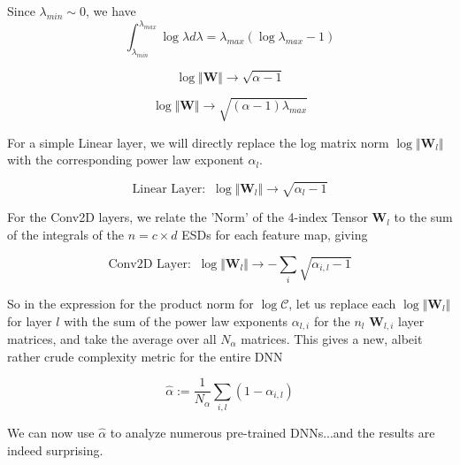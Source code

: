 Since $\lambda_{min}\sim 0$, we have
$$\int_{\lambda_{min}}^{\lambda_{max}}\log\lambda d\lambda=\lambda_{max}(\log \lambda_{max} - 1)$$







$$\log\Vert\mathbf{W}\Vert\rightarrow\sqrt{\alpha-1}$$


$$\log\Vert\mathbf{W}\Vert\rightarrow\sqrt{(\alpha-1)\lambda_{max}}$$


For a simple Linear layer, we will directly replace the log matrix norm $\log\Vert\mathbf{W}_{l}\Vert$ with the corresponding power law exponent $\alpha_{l}$.  

$$\text{Linear Layer:}\;\;\log\Vert\mathbf{W}_{l}\Vert\rightarrow\sqrt{\alpha_{l}-1}$$

For the Conv2D layers, we relate the 'Norm' of the 4-index Tensor $\mathbf{W}_{l}$ to the sum of the integrals of the $n=c\times d$ ESDs for each feature map, giving 

$$\text{Conv2D Layer:}\;\;\log\Vert\mathbf{W}_{l}\Vert\rightarrow-\sum_{i}\sqrt{\alpha_{i,l}-1}$$

So in the expression for the product norm for $\log\mathcal{C}$, let us replace each $\log\Vert\mathbf{W}_{l}\Vert$ for layer $l$ with the sum of the power law exponents $\alpha_{l,i}$ for the $n{_l}$ $\mathbf{W}_{l,i}$ layer matrices, and take the average over all $N_{\alpha}$  matrices.  This gives a new, albeit rather crude complexity metric for the entire DNN


$$\hat{\alpha}:=\dfrac{1}{N_{\alpha}}\sum_{i,l}(1-\alpha_{i,l})$$



We can now use $\hat{\alpha}$ to analyze numerous pre-trained DNNs...and the results are indeed surprising.



